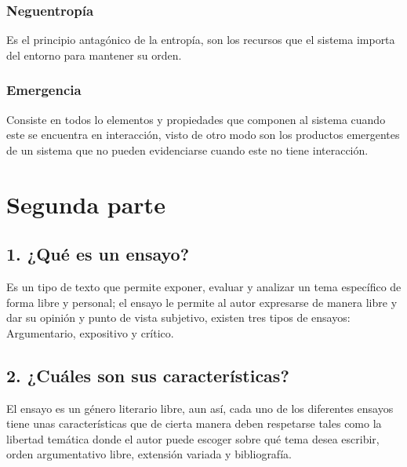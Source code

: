 \documentclass[a4paper,man,natbib]{apa6}
\begin{document}
\subsubsection{Neguentropía}
Es el principio antagónico de la entropía, son los recursos que el sistema importa del entorno para mantener su orden. \citep{10.2307/j.ctv1228hsw}


\subsubsection{Emergencia}
Consiste en todos lo elementos y propiedades que componen al sistema cuando este se encuentra en interacción, visto de otro modo son los productos emergentes de un sistema que no pueden evidenciarse cuando este no tiene interacción. \citep{ossa}

\section{Segunda parte}
\subsection{1. ¿Qué es un ensayo?}
Es un tipo de texto que permite exponer, evaluar y analizar un tema específico de forma libre y personal; el ensayo le permite al autor expresarse de manera libre y dar su opinión y punto de vista subjetivo, existen tres tipos de ensayos: Argumentario, expositivo y crítico. \citep{vasquez2005preguntele}
\subsection{2. ¿Cuáles son sus características?}
El ensayo es un género literario libre, aun así, cada uno de los diferentes ensayos tiene unas características que de cierta manera deben respetarse tales como la libertad temática donde el autor puede escoger sobre qué tema desea escribir, orden argumentativo libre, extensión variada y bibliografía.
\end{document}
